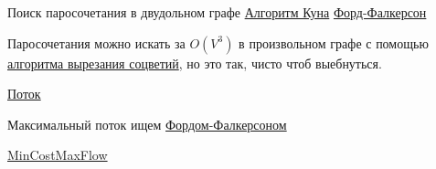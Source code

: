 Поиск паросочетания в двудольном графе
\href{https://neerc.ifmo.ru/wiki/index.php?title=%D0%90%D0%BB%D0%B3%D0%BE%D1%80%D0%B8%D1%82%D0%BC_%D0%9A%D1%83%D0%BD%D0%B0_%D0%B4%D0%BB%D1%8F_%D0%BF%D0%BE%D0%B8%D1%81%D0%BA%D0%B0_%D0%BC%D0%B0%D0%BA%D1%81%D0%B8%D0%BC%D0%B0%D0%BB%D1%8C%D0%BD%D0%BE%D0%B3%D0%BE_%D0%BF%D0%B0%D1%80%D0%BE%D1%81%D0%BE%D1%87%D0%B5%D1%82%D0%B0%D0%BD%D0%B8%D1%8F}{Алгоритм Куна}
\href{https://neerc.ifmo.ru/wiki/index.php?title=%D0%90%D0%BB%D0%B3%D0%BE%D1%80%D0%B8%D1%82%D0%BC_%D0%A4%D0%BE%D1%80%D0%B4%D0%B0-%D0%A4%D0%B0%D0%BB%D0%BA%D0%B5%D1%80%D1%81%D0%BE%D0%BD%D0%B0_%D0%B4%D0%BB%D1%8F_%D0%BF%D0%BE%D0%B8%D1%81%D0%BA%D0%B0_%D0%BC%D0%B0%D0%BA%D1%81%D0%B8%D0%BC%D0%B0%D0%BB%D1%8C%D0%BD%D0%BE%D0%B3%D0%BE_%D0%BF%D0%B0%D1%80%D0%BE%D1%81%D0%BE%D1%87%D0%B5%D1%82%D0%B0%D0%BD%D0%B8%D1%8F}{Форд-Фалкерсон}

Паросочетания можно искать за $O(V^3)$ в произвольном графе с помощью \href{https://neerc.ifmo.ru/wiki/index.php?title=%D0%90%D0%BB%D0%B3%D0%BE%D1%80%D0%B8%D1%82%D0%BC_%D0%B2%D1%8B%D1%80%D0%B5%D0%B7%D0%B0%D0%BD%D0%B8%D1%8F_%D1%81%D0%BE%D1%86%D0%B2%D0%B5%D1%82%D0%B8%D0%B9}{алгоритма вырезания соцветий}, но это так, чисто чтоб выебнуться.

\href{https://neerc.ifmo.ru/wiki/index.php?title=%D0%9E%D0%BF%D1%80%D0%B5%D0%B4%D0%B5%D0%BB%D0%B5%D0%BD%D0%B8%D0%B5_%D1%81%D0%B5%D1%82%D0%B8,_%D0%BF%D0%BE%D1%82%D0%BE%D0%BA%D0%B0}{Поток}

Максимальный поток ищем \href{https://neerc.ifmo.ru/wiki/index.php?title=%D0%90%D0%BB%D0%B3%D0%BE%D1%80%D0%B8%D1%82%D0%BC_%D0%A4%D0%BE%D1%80%D0%B4%D0%B0-%D0%A4%D0%B0%D0%BB%D0%BA%D0%B5%D1%80%D1%81%D0%BE%D0%BD%D0%B0,_%D1%80%D0%B5%D0%B0%D0%BB%D0%B8%D0%B7%D0%B0%D1%86%D0%B8%D1%8F_%D1%81_%D0%BF%D0%BE%D0%BC%D0%BE%D1%89%D1%8C%D1%8E_%D0%BF%D0%BE%D0%B8%D1%81%D0%BA%D0%B0_%D0%B2_%D0%B3%D0%BB%D1%83%D0%B1%D0%B8%D0%BD%D1%83}{Фордом-Фалкерсоном}

\href{https://neerc.ifmo.ru/wiki/index.php?title=%D0%9F%D0%BE%D1%82%D0%BE%D0%BA_%D0%BC%D0%B8%D0%BD%D0%B8%D0%BC%D0%B0%D0%BB%D1%8C%D0%BD%D0%BE%D0%B9_%D1%81%D1%82%D0%BE%D0%B8%D0%BC%D0%BE%D1%81%D1%82%D0%B8}{MinCostMaxFlow}

